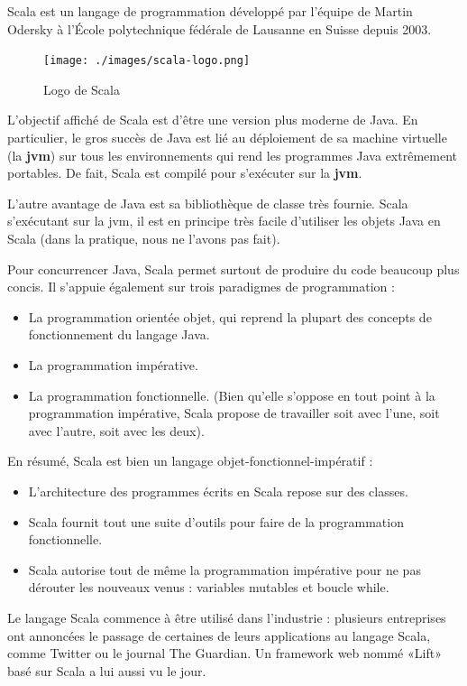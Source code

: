 Scala est un langage de programmation développé par l'équipe de Martin
Odersky à l'École polytechnique fédérale de Lausanne en Suisse depuis
2003.

\begin{figure}[h!]
\label{fig:scala-logo}
\centering
\texttt{[image: ./images/scala-logo.png]}
\caption{Logo de Scala}
\end{figure}

L'objectif affiché de Scala est d'être une version plus moderne de Java.
En particulier, le gros succès de Java est lié au déploiement de sa
machine virtuelle (la \textbf{jvm}) sur tous les environnements qui rend
les programmes Java extrêmement portables. De fait, Scala est compilé
pour s'exécuter sur la \textbf{jvm}.

L'autre avantage de Java est sa bibliothèque de classe très fournie.
Scala s'exécutant sur la jvm, il est en principe très facile d'utiliser
les objets Java en Scala (dans la pratique, nous ne l'avons pas fait).

Pour concurrencer Java, Scala permet surtout de produire du code
beaucoup plus concis. Il s'appuie également sur trois paradigmes de
programmation :

\begin{itemize}
\tightlist
\item
  La programmation orientée objet, qui reprend la plupart des concepts
  de fonctionnement du langage Java.
\item
  La programmation impérative.
\item
  La programmation fonctionnelle. (Bien qu'elle s'oppose en tout point à
  la programmation impérative, Scala propose de travailler soit avec
  l'une, soit avec l'autre, soit avec les deux).
\end{itemize}

En résumé, Scala est bien un langage objet-fonctionnel-impératif :

\begin{itemize}
\tightlist
\item
  L'architecture des programmes écrits en Scala repose sur des classes.
\item
  Scala fournit tout une suite d'outils pour faire de la programmation
  fonctionnelle.
\item
  Scala autorise tout de même la programmation impérative pour ne pas
  dérouter les nouveaux venus : variables mutables et boucle while.
\end{itemize}

Le langage Scala commence à être utilisé dans l'industrie : plusieurs
entreprises ont annoncées le passage de certaines de leurs applications
au langage Scala, comme Twitter ou le journal The Guardian. Un framework
web nommé «Lift» basé sur Scala a lui aussi vu le jour.

